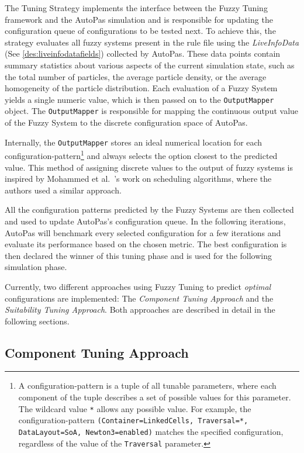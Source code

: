 The Tuning Strategy implements the interface between the Fuzzy Tuning framework and the AutoPas simulation and is responsible for updating the configuration queue of configurations to be tested next. To achieve this, the strategy evaluates all fuzzy systems present in the rule file using the \emph{LiveInfoData} (See \ref{des:liveinfodatafields}) collected by AutoPas. These data points contain summary statistics about various aspects of the current simulation state, such as the total number of particles, the average particle density, or the average homogeneity of the particle distribution. Each evaluation of a Fuzzy System yields a single numeric value, which is then passed on to the \texttt{OutputMapper} object. The \texttt{OutputMapper} is responsible for mapping the continuous output value of the Fuzzy System to the discrete configuration space of AutoPas.

Internally, the \texttt{OutputMapper} stores an ideal numerical location for each configuration-pattern\footnote{A configuration-pattern is a tuple of all tunable parameters, where each component of the tuple describes a set of possible values for this parameter. The wildcard value \texttt{*} allows any possible value. For example, the configuration-pattern \texttt{(Container=LinkedCells, Traversal=*, DataLayout=SoA, Newton3=enabled)} matches the specified configuration, regardless of the value of the \texttt{Traversal} parameter.} and always selects the option closest to the predicted value. This method of assigning discrete values to the output of fuzzy systems is inspired by Mohammed et al.~\cite{Mohammed2022}'s work on scheduling algorithms, where the authors used a similar approach.

All the configuration patterns predicted by the Fuzzy Systems are then collected and used to update AutoPas's configuration queue. In the following iterations, AutoPas will benchmark every selected configuration for a few iterations and evaluate its performance based on the chosen metric. The best configuration is then declared the winner of this tuning phase and is used for the following simulation phase.

Currently, two different approaches using Fuzzy Tuning to predict \emph{optimal} configurations are implemented: The \emph{Component Tuning Approach} and the \emph{Suitability Tuning Approach}. Both approaches are described in detail in the following sections.


\subsection{Component Tuning Approach}
\label{sec:componentTuningApproach}

